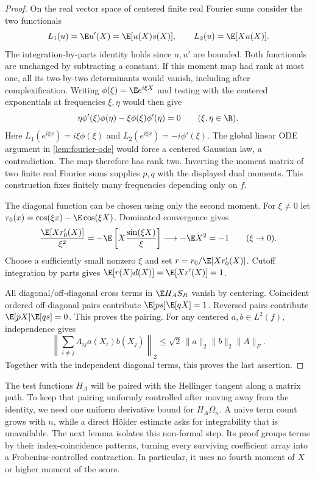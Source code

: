 \begin{proof}
On the real vector space of centered finite real Fourier sums
consider the two functionals
\[
 L_1(u)=\E u'(X)=\E[u(X)s(X)],
 \qquad L_2(u)=\E[Xu(X)].
\]
The integration-by-parts identity holds since $u,u'$ are bounded.
Both functionals are unchanged by subtracting a constant.  If this
moment map had rank at most one, all its two-by-two determinants
would vanish, including after complexification.  Writing
$\phi(\xi)=\E e^{i\xi X}$ and testing with the centered
exponentials at frequencies $\xi,\eta$ would then give
\[
 \eta\phi'(\xi)\phi(\eta)
       -\xi\phi(\xi)\phi'(\eta)=0
 \qquad(\xi,\eta\in\R).
\]
Here $L_1(e^{i\xi x})=i\xi\phi(\xi)$ and
$L_2(e^{i\xi x})=-i\phi'(\xi)$.  The global linear ODE
argument in \cref{lem:fourier-ode} would force a centered
Gaussian law, a contradiction.  The map therefore has rank two.
Inverting the moment matrix of two finite real Fourier sums
supplies $p,q$ with the displayed dual
moments.  This construction fixes finitely many frequencies
depending only on $f$.

The diagonal function can be chosen using only the second moment.
For $\xi\ne0$ let
$r_0(x)=\cos(\xi x)-\E\cos(\xi X)$.  Dominated convergence
gives
\[
 \frac{\E[Xr_0'(X)]}{\xi^2}
 =-\E\left[X\frac{\sin(\xi X)}\xi\right]
 \longrightarrow-\E X^2=-1
 \qquad(\xi\to0).
\]
Choose a sufficiently small nonzero $\xi$ and set
$r=r_0/\E[Xr_0'(X)]$.  Cutoff integration by parts gives
$\E[r(X)d(X)]=\E[Xr'(X)]=1$.

All diagonal/off-diagonal cross terms in $\E H_AS_B$ vanish
by centering.  Coincident ordered off-diagonal pairs contribute
$\E[ps]\E[qX]=1$.
Reversed pairs contribute $\E[pX]\E[qs]=0$.
This proves the pairing.
For any centered $a,b\in L^2(f)$, independence gives
\begin{equation}
 \left\|\sum_{i\ne j}A_{ij}a(X_i)b(X_j)\right\|_2
 \le\sqrt2\,\|a\|_2\|b\|_2\|A\|_F.
 \label{eq:quadratic-chaos-bound}
\end{equation}
Together with the independent diagonal terms, this proves the last
assertion.
\end{proof}

The test functions \(H_A\) will be paired with the Hellinger tangent along a matrix
path.  To keep that pairing uniformly controlled after moving away from the
identity, we need one uniform derivative bound for \(H_A\Omega_n\).  A naive
term count grows with \(n\), while a direct H\"older estimate asks for
integrability that is unavailable.  The next lemma isolates this non-formal
step.  Its proof groups terms by their index-coincidence patterns, turning every
surviving coefficient array into a Frobenius-controlled contraction.  In
particular, it uses no fourth moment of \(X\) or higher moment of the score.


